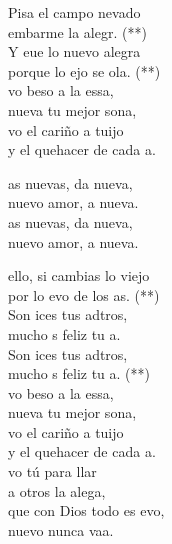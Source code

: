 \begin{cancion}%
	Pisa el campo nevado\\
	embarme la alegr. (**)\\
	Y eue lo nuevo  alegra \\
	porque lo ejo se ola. (**)\\
	\jump
	vo beso a la essa, \\
	nueva tu mejor sona,\\
	vo el cariño a tuijo \\
	y el quehacer de cada a.\jump\\
	\begin{chorus}%
		as nuevas, da nueva, \\
		nuevo amor, a nueva.\\
		as nuevas, da nueva, \\
		nuevo amor, a nueva.\jump\\
	\end{chorus}%
	 ello, si cambias lo viejo \\
	por lo evo de los as. (**)\\
	Son ices tus adtros, \\
	mucho s feliz tu a.\\
	Son ices tus adtros, \\
	mucho s feliz tu a. (**)\\
	\jump
	vo beso a la essa, \\
	nueva tu mejor sona,\\
	vo el cariño a tuijo \\
	y el quehacer de cada a.\\
	\jump
	vo tú para llar \\
	a otros la alega,\\
	que con Dios todo es evo, \\
	nuevo nunca vaa.\\
\end{cancion}%
